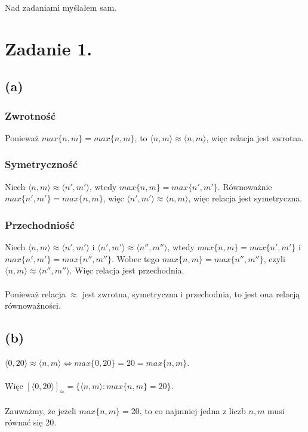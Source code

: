 \documentclass{article}
\begin{document}
 
 
 
 
 
 
 
 
 
 
 
 
\maketitle
Nad zadaniami myślałem sam. 
\section*{Zadanie 1.}
\subsection*{(a)}
\subsubsection*{Zwrotność}
Ponieważ $max\{n,m\} = max\{n,m\}$, to $\langle n,m \rangle \approx \langle n,m \rangle$, więc relacja jest zwrotna.
\subsubsection*{Symetryczność}
Niech $\langle n,m \rangle \approx \langle n',m' \rangle$, wtedy $max\{n,m\} = max\{n',m'\}$. 
Równoważnie $max\{n',m'\} = max\{n,m\}$, więc $\langle n',m' \rangle \approx \langle n,m \rangle$, więc relacja jest symetryczna.
\subsubsection*{Przechodniość}
Niech $\langle n,m \rangle \approx \langle n',m' \rangle$ i $\langle n',m' \rangle \approx \langle n'',m'' \rangle$, wtedy $max\{n,m\} = max\{n',m'\}$ i $max\{n',m'\} = max\{n'',m''\}$. 
Wobec tego $max\{n,m\} = max\{n'',m''\}$, czyli $\langle n,m \rangle \approx \langle n'',m'' \rangle$. Więc relacja jest przechodnia.
\\\\
Ponieważ relacja $\approx$ jest zwrotna, symetryczna i przechodnia, to jest ona relacją równoważności.

\subsection*{(b)}
$\langle 0,20 \rangle \approx \langle n,m \rangle \Leftrightarrow max\{0,20\} = 20 = max\{n,m\}$.
\\\\
Więc $[\langle 0,20 \rangle ]_{\approx} = \{\langle n,m \rangle : max\{n,m\} = 20 \}$.
\\\\
Zauważmy, że jeżeli $max\{n,m\} = 20$, to co najmniej jedna z liczb $n,m$ musi równać się 20.
\end{document}
